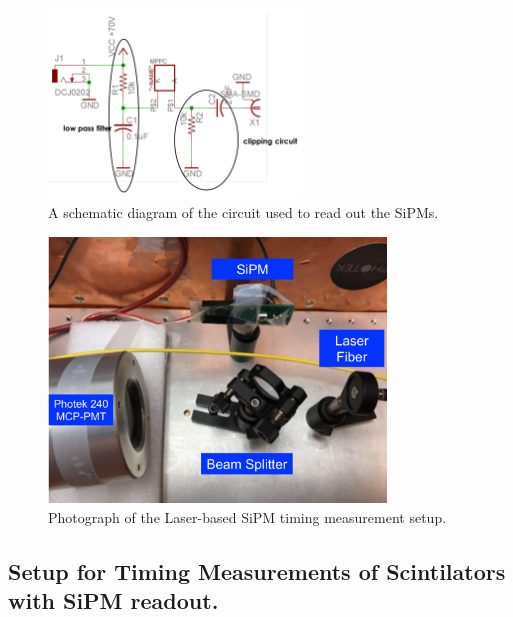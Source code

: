 \begin{figure}[htbp]
\centering
\includegraphics[width=0.60\textwidth]{figures/CircuitDiagram.pdf}
\caption{A schematic diagram of the circuit used to read out the SiPMs.}
\label{fig:Circuit}
\end{figure}


\begin{figure}[htbp] 
\centering
\includegraphics[width=0.80\textwidth]{figures/SiPMSetup1.pdf} 
\caption{Photograph of the Laser-based SiPM timing measurement setup.} 
\label{fig:laserSetup} 
\end{figure} 

\subsection{Setup for Timing Measurements of Scintilators with SiPM readout.}

